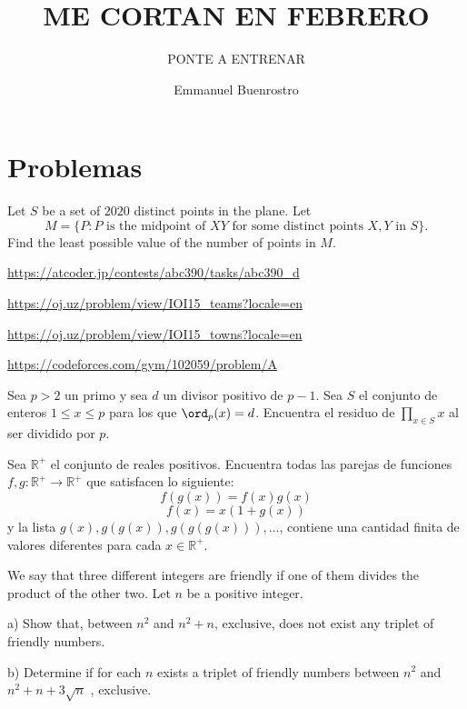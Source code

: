 \documentclass[11pt]{scrartcl}
\title{ME CORTAN EN FEBRERO }
\subtitle{PONTE A ENTRENAR}
\author{Emmanuel Buenrostro}
\begin{document}
\maketitle

\section{Problemas}
\begin{problem}
Let $S$ be a set of $2020$ distinct points in the plane. Let
\[M=\{P:P\text{ is the midpoint of }XY\text{ for some distinct points }X,Y\text{ in }S\}.\]
Find the least possible value of the number of points in $M$.
\end{problem}
\begin{problem}
\url{https://atcoder.jp/contests/abc390/tasks/abc390_d} 
\end{problem}
\begin{problem}
\url{https://oj.uz/problem/view/IOI15_teams?locale=en}
\end{problem}
\begin{problem}
\url{https://oj.uz/problem/view/IOI15_towns?locale=en}
\end{problem}
\begin{problem}
\url{https://codeforces.com/gym/102059/problem/A}
\end{problem}
\begin{problem}
Sea $p>2$ un primo y sea $d$ un divisor positivo de $p-1$. Sea $S$ el conjunto de enteros $1 \leq x \leq p$ para los que $\ord_p(x)=d$. Encuentra el residuo de $\prod_{x \in S} x$ al ser dividido por $p$.
\end{problem}
\begin{problem}
Sea $\mathbb{R}^{+}$ el conjunto de reales positivos. Encuentra todas las parejas de funciones $f,g: \mathbb{R}^{+} \rightarrow \mathbb{R}^{+}$
que satisfacen lo siguiente: 
\[f(g(x))=f(x)g(x)\]
\[f(x)=x(1+g(x))\]
y la lista $g(x), g(g(x)), g(g(g(x))), \ldots$, contiene una cantidad finita de valores diferentes para cada $x\in \mathbb{R}^{+}$.
\end{problem}
\begin{problem}
We say that three different integers are friendly if one of them divides the product of the other two. Let $n$ be a positive integer.

a) Show that, between $n^2$ and $n^2+n$, exclusive, does not exist any triplet of friendly numbers.

b) Determine if for each $n$ exists a triplet of friendly numbers between $n^2$ and $n^2+n+3\sqrt{n}$ , exclusive.
\end{problem}
\end{document}
